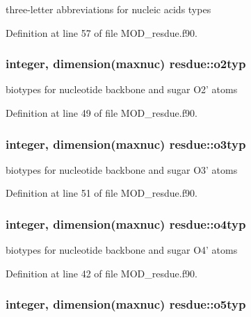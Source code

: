 three-\/letter abbreviations for nucleic acids types 



Definition at line 57 of file M\-O\-D\-\_\-resdue.\-f90.

\hypertarget{classresdue_a59687c403572e1626b6d69b8738ed6a6}{
\subsubsection[{o2typ}]{\setlength{\rightskip}{0pt plus 5cm}integer, dimension(maxnuc) resdue\-::o2typ}}\label{classresdue_a59687c403572e1626b6d69b8738ed6a6}


biotypes for nucleotide backbone and sugar O2' atoms 



Definition at line 49 of file M\-O\-D\-\_\-resdue.\-f90.

\hypertarget{classresdue_a95d0afec50d06f37606365889c369461}{
\subsubsection[{o3typ}]{\setlength{\rightskip}{0pt plus 5cm}integer, dimension(maxnuc) resdue\-::o3typ}}\label{classresdue_a95d0afec50d06f37606365889c369461}


biotypes for nucleotide backbone and sugar O3' atoms 



Definition at line 51 of file M\-O\-D\-\_\-resdue.\-f90.

\hypertarget{classresdue_a88a1df13143a4d2b4e252e4f25d3f1dc}{
\subsubsection[{o4typ}]{\setlength{\rightskip}{0pt plus 5cm}integer, dimension(maxnuc) resdue\-::o4typ}}\label{classresdue_a88a1df13143a4d2b4e252e4f25d3f1dc}


biotypes for nucleotide backbone and sugar O4' atoms 



Definition at line 42 of file M\-O\-D\-\_\-resdue.\-f90.

\hypertarget{classresdue_a6a04dafa45afb5a8adf89f18467afb4a}{
\subsubsection[{o5typ}]{\setlength{\rightskip}{0pt plus 5cm}integer, dimension(maxnuc) resdue\-::o5typ}}\label{classresdue_a6a04dafa45afb5a8adf89f18467afb4a}


